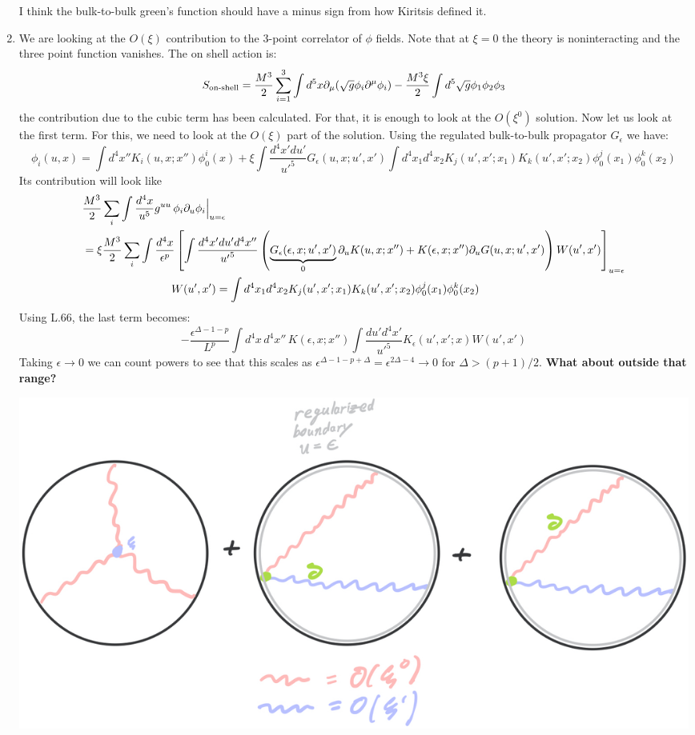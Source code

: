 \documentclass[11pt, class=article, crop=false]{standalone}
\begin{document}
\begin{enumerate}
	I think the bulk-to-bulk green's function should have a minus sign from how Kiritsis defined it.
	
	\item We are looking at the $O(\xi)$ contribution to the 3-point correlator of $\phi$ fields. Note that at $\xi = 0$ the theory is noninteracting and the three point function vanishes. The on shell action is:
	\[
		S_{\text{on-shell}} = \frac{M^3}{2} \sum_{i=1}^3 \int d^5 x \partial_\mu (\sqrt{g} \phi_i \partial^\mu \phi_i) - \frac{M^3 \xi}{2} \int d^5 \sqrt{g} \phi_1 \phi_2 \phi_3
	\]
	the contribution due to the cubic term has been calculated. For that, it is enough to look at the $O(\xi^0)$ solution. Now let us look at the first term. For this, we need to look at the $O(\xi)$ part of the solution. Using the regulated bulk-to-bulk propagator $G_{\epsilon}$ we have:
	\[
		\phi_i(u, x) = \int d^4 x'' K_i(u, x; x'') \phi^i_0(x) + \xi \int \frac{d^4 x' du'}{{u'}^5} G_{\epsilon}(u, x; u', x') \int d^4 x_1 d^4 x_2 K_j(u', x'; x_1) K_k(u', x'; x_2) \phi_0^j(x_1) \phi_0^k(x_2)
	\]
	Its contribution will look like 
	\[
		\begin{aligned}
			&\frac{M^3}{2} \sum_i \int \frac{d^4 x}{u^5} g^{uu}\, \phi_i \partial_u \phi_i \Big|_{u=\epsilon}\\
			&= \xi\frac{M^3}{2} \sum_i \int \frac{d^4 x}{\epsilon^p} \left[ \int \frac{d^4 x' du' d^4 x''}{{u'}^5} \left( \underbrace{G_{\epsilon}(\epsilon, x; u', x')}_{0} \partial_u K(u, x; x'') + K(\epsilon, x; x'') \partial_u G(u, x; u', x') \right) W(u', x') \right]_{u=\epsilon} \\
			& \qquad \qquad \qquad \qquad W(u', x') = \int d^4 x_1 d^4 x_2 K_j(u', x'; x_1) K_k(u', x'; x_2) \phi_0^j(x_1) \phi_0^k(x_2)
		\end{aligned}
	\]
	Using L.66, the last term becomes:
	\[
		- \frac{\epsilon^{\Delta-1-p}}{L^p} \int d^4 x\, d^4 x''\, K(\epsilon, x; x'') \int \frac{du' d^4 x'}{{u'}^5} K_{\epsilon}(u', x'; x) W(u', x')
	\]
		Taking $\epsilon \to 0$ we can count powers to see that this scales as $\epsilon^{\Delta - 1-p + \Delta} = \epsilon^{2 \Delta - 4} \to 0$ for $\Delta > (p+1)/2$. \textbf{What about outside that range?}
		
	\begin{center}
		\includegraphics[scale=0.3]{"Drawings/Cubic on Boundary"}
	\end{center}
	

\end{enumerate}
\end{document}
